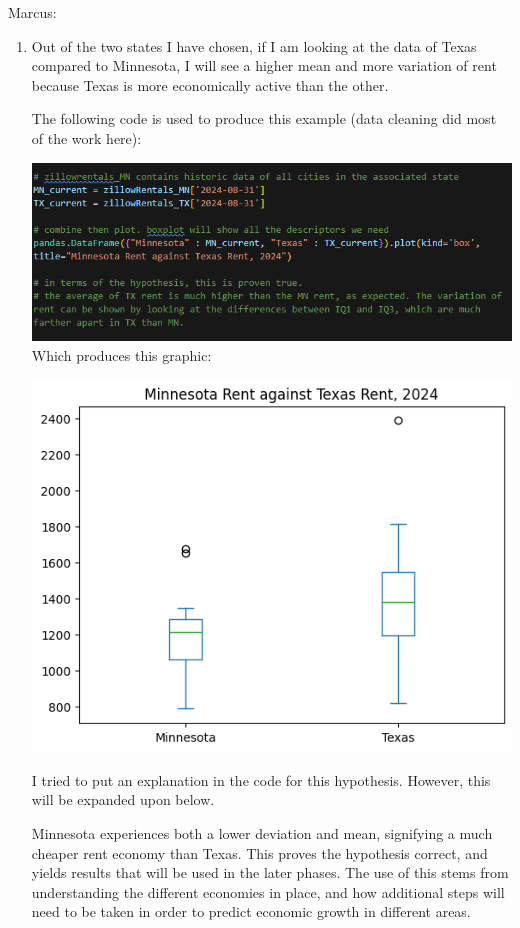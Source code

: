 \documentclass[a4paper]{article}
\begin{document}
\begin{enumerate}
  Marcus:

  \begin{enumerate}
    \item Out of the two states I have chosen, if I am looking at the data of Texas compared to Minnesota, I will see a higher mean and more variation of rent because Texas is more economically active than the other.
    
    The following code is used to produce this example (data cleaning did most of the work here): 

    \includegraphics[scale=0.75]{Marcus-Hypothesis-1-code.png}
    \bigbreak
    Which produces this graphic: 

    \includegraphics[scale=0.9]{Marcus-Hypothesis-1.png}

    I tried to put an explanation in the code for this hypothesis. However, this will be expanded upon below. 
    
    Minnesota experiences both a lower deviation and mean, signifying a much cheaper rent economy than Texas. This proves the hypothesis correct, and yields results that will be used in the later phases. The use of this stems from understanding the different economies in place, and how additional steps will need to be taken in order to predict economic growth in different areas. 



\end{enumerate}
\end{enumerate}
\end{document}
